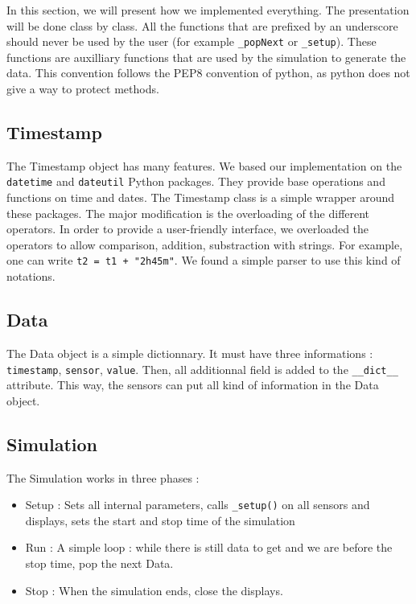 
In this section, we will present how we implemented everything. The
presentation will be done class by class. All the functions that are
prefixed by an underscore should never be used by the user (for example
\verb!_popNext! or \verb!_setup!). These functions are auxilliary functions
that are used by the simulation to generate the data. This convention follows
the PEP8 convention of python, as python does not give a way to protect
methods.

\subsection{Timestamp}

The Timestamp object has many features. We based our implementation on the
\verb!datetime! and \verb!dateutil! Python packages. They provide base
operations and functions on time and dates. The Timestamp class is a simple
wrapper around these packages. The major modification is the overloading of the
different operators. In order to provide a user-friendly interface, we
overloaded the operators to allow comparison, addition, substraction with
strings. For example, one can write \verb!t2 = t1 + "2h45m"!. We found a simple
parser to use this kind of notations.

\subsection{Data}

The Data object is a simple dictionnary. It must have three informations :
\verb!timestamp!, \verb!sensor!, \verb!value!. Then, all additionnal field is
added to the \verb!__dict__! attribute.
This way, the sensors can put all kind of information in the Data object.

\subsection{Simulation}

The Simulation works in three phases :
\begin{itemize}
    \item Setup : Sets all internal parameters, calls \verb!_setup()! on all
sensors and displays, sets the start and stop time of the simulation
    \item Run : A simple loop : while there is still data to get and we are
before the stop time, pop the next Data.
    \item Stop : When the simulation ends, close the displays.
\end{itemize}

